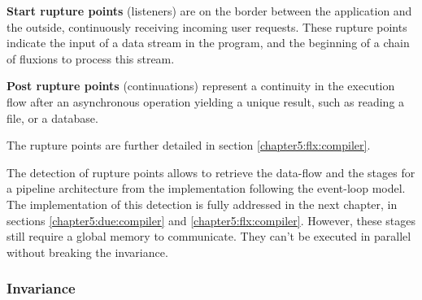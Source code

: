 \textbf{Start rupture points} (listeners) are on the border between the application and the outside, continuously receiving incoming user requests.
These rupture points indicate the input of a data stream in the program, and the beginning of a chain of fluxions to process this stream.

\textbf{Post rupture points} (continuations) represent a continuity in the execution flow after an asynchronous operation yielding a unique result, such as reading a file, or a database.

The rupture points are further detailed in section \ref{chapter5:flx:compiler}.




The detection of rupture points allows to retrieve the data-flow and the stages for a pipeline architecture from the implementation following the event-loop model.
The implementation of this detection is fully addressed in the next chapter, in sections \ref{chapter5:due:compiler} and \ref{chapter5:flx:compiler}.
However, these stages still require a global memory to communicate.
They can't be executed in parallel without breaking the invariance.





\subsubsection{Invariance}

